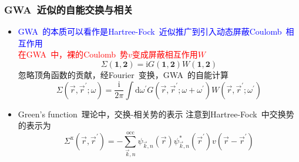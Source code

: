 \documentclass[cjk,slidestop,compress,mathserif,blue]{beamer}
\begin{document}
\frame
{
	\frametitle{\textrm{GWA~}近似的自能交换与相关}
	\begin{itemize}
		\item \textcolor{blue}{\textrm{GWA~}的本质可以看作是\textrm{Hartree-Fock~}近似推广到引入动态屏蔽\textrm{Coulomb~}相互作用}\\
			\textcolor{red}{在\textrm{GWA~}中，裸的\textrm{Coulomb~}势$v$变成屏蔽相互作用$W$}
			\begin{displaymath}
				\Sigma(\mathbf{1},\mathbf{2})=\mathrm{i}G(\mathbf{1},\mathbf{2})W(\mathbf{1},\mathbf{2})
			\end{displaymath}
	忽略顶角函数的贡献，经\textrm{Fourier~}变换，\textrm{GWA~}的自能计算
			\begin{displaymath}
				\Sigma(\vec r,\vec r^{\prime};\omega)=\frac{\mathrm{i}}{2\pi}\int\mathrm{d}\omega^{\prime}G(\vec r,\vec r^{\prime};\omega+\omega^{\prime})W(\vec r,\vec r^{\prime};\omega^{\prime})
			\end{displaymath}
		\item \textrm{Green's function~}理论中，交换-相关势的表示
			\vskip 3pt
		注意到\textrm{Hartree-Fock~}中交换势的表示为
			\begin{displaymath}
				\Sigma^{\mathrm{x}}(\vec r,\vec r^{\prime})=-\sum_{\vec k,n}^{\mathrm{occ}}\psi_{\vec k,n}(\vec r)\psi_{\vec k,n}^{\ast}(\vec r^{\prime})v(\vec r-\vec r^{\prime})
			\end{displaymath}
	\end{itemize}
}
\end{document}
